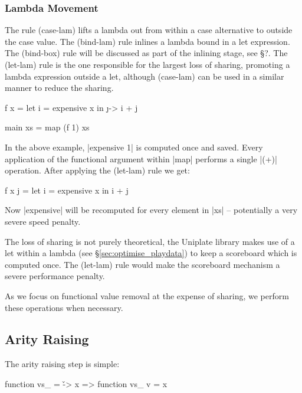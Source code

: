 \documentclass[preprint]{sigplanconf}
\begin{document}
\subsubsection{Lambda Movement}

The rule (case-lam) lifts a lambda out from within a case alternative to outside the case value. The (bind-lam) rule inlines a lambda bound in a let expression. The (bind-box) rule will be discussed as part of the inlining stage, see \S?. The (let-lam) rule is the one responsible for the largest loss of sharing, promoting a lambda expression outside a let, although (case-lam) can be used in a similar manner to reduce the sharing.

\begin{example}
\begin{code}
f x = let i = expensive x
      in \j -> i + j

main xs = map (f 1) xs
\end{code}

In the above example, |expensive 1| is computed once and saved. Every application of the functional argument within |map| performs a single |(+)| operation. After applying the (let-lam) rule we get:

\begin{code}
f x j = let i = expensive x
        in i + j
\end{code}

Now |expensive| will be recomputed for every element in |xs| -- potentially a very severe speed penalty.
\end{example}

The loss of sharing is not purely theoretical, the Uniplate library \cite{uniplate} makes use of a let within a lambda (see \S\ref{sec:optimise_playdata}) to keep a scoreboard which is computed once. The (let-lam) rule would make the scoreboard mechanism a severe performance penalty.

As we focus on functional value removal at the expense of sharing, we perform these operations when necessary.


\subsection{Arity Raising}

The arity raising step is simple:

\begin{code}
function vs_ = \v -> x
    => function vs_ v = x
\end{code}
\end{document}
